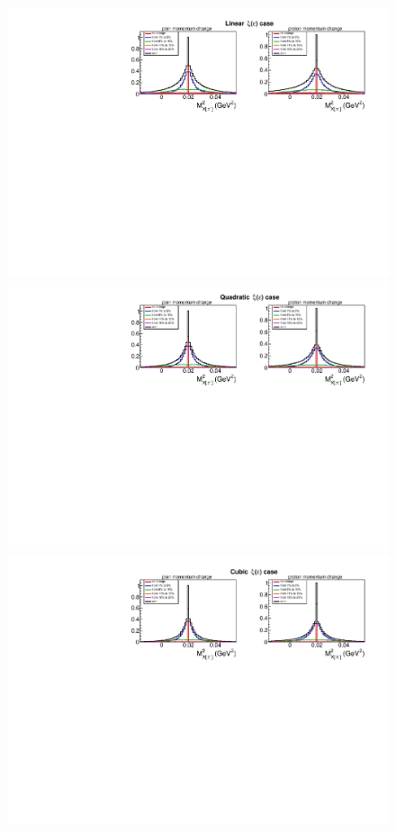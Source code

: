 \begin{figure}[!ht]
\begin{center}
\includegraphics[width=\textwidth]{pictures/mm_fsi_detail_linear_new.pdf}
\includegraphics[width=\textwidth]{pictures/mm_fsi_detail_sq_new.pdf}
\includegraphics[width=\textwidth]{pictures/mm_fsi_detail_cube_new.pdf}

\end{center}
\end{figure}
